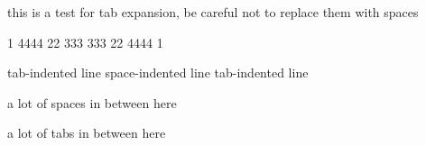 this is a test for tab expansion, be careful not to replace them with spaces

1 4444 22 333 333 22 4444 1

\begin{DoxyVerb}tab-indented line
space-indented line
tab-indented line
\end{DoxyVerb}


a lot of spaces in between here

a lot of tabs in between here 